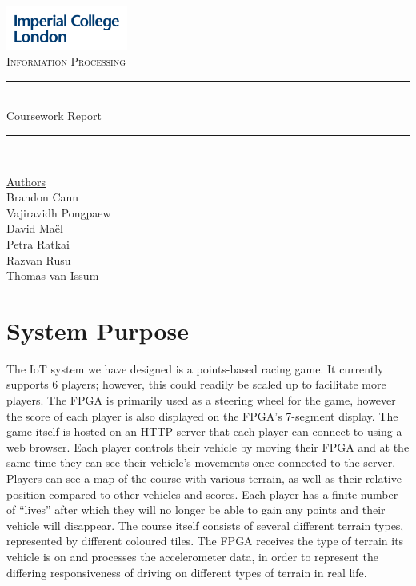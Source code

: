 \documentclass[12pt,a4paper]{article}
\begin{document}
\begin{titlepage}
	\newcommand{\HRule}{\rule{\linewidth}{0.5mm}}
    \includegraphics[width = 4cm]{./Images/Logo.jpg}\\[0.5cm] 
    
    \center 
	\textsc{\large Information Processing }\\[0.3cm] 
    
	\HRule \\[0.3cm]
	Coursework Report
    \HRule \\[0.7cm]
     
    \begin{center}
		\underline{Authors}\\[0.1cm] Brandon Cann\\[0.1cm]
        Vajiravidh Pongpaew\\[0.1cm]
        David Maël\\[0.1cm]
        Petra Ratkai\\[0.1cm]
		Razvan Rusu\\[0.1cm]
		Thomas van Issum\\[0.7cm]
	\end{center} \large

    \tableofcontents

    \vfill %
\end{titlepage}

\section{\normalsize System Purpose}

{\scriptsize The IoT system we have designed is a points-based racing game. 
It currently supports 6 players; however, this could readily be 
scaled up to facilitate more players. The FPGA is primarily used 
as a steering wheel for the game, however the score of each player 
is also displayed on the FPGA’s 7-segment display. The game itself 
is hosted on an HTTP server that each player can connect to using a 
web browser. Each player controls their vehicle by moving their FPGA 
and at the same time they can see their vehicle’s movements once 
connected to the server. Players can see a map of the course with 
various terrain, as well as their relative position compared to 
other vehicles and scores. Each player has a finite number of “lives” 
after which they will no longer be able to gain any points and their 
vehicle will disappear. The course itself consists of several different 
terrain types, represented by different coloured tiles. The FPGA 
receives the type of terrain its vehicle is on and processes the 
accelerometer data, in order to represent the differing responsiveness 
of driving on different types of terrain in real life. }
\end{document}
